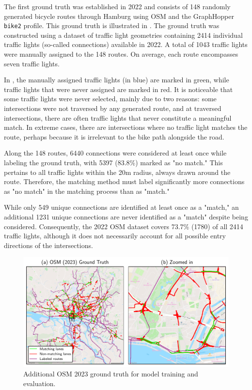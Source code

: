 The first ground truth was established in 2022 and consists of 148 randomly generated bicycle routes through Hamburg using OSM and the GraphHopper \texttt{bike2} profile. This ground truth is illustrated in . The ground truth was constructed using a dataset of traffic light geometries containing 2414 individual traffic lights (so-called connections) available in 2022. A total of 1043 traffic lights were manually assigned to the 148 routes. On average, each route encompasses seven traffic lights.

In , the manually assigned traffic lights (in blue) are marked in green, while traffic lights that were never assigned are marked in red. It is noticeable that some traffic lights were never selected, mainly due to two reasons: some intersections were not traversed by any generated route, and at traversed intersections, there are often traffic lights that never constitute a meaningful match. In extreme cases, there are intersections where no traffic light matches the route, perhaps because it is irrelevant to the bike path alongside the road.

Along the 148 routes, 6440 connections were considered at least once while labeling the ground truth, with 5397 (83.8\%) marked as "no match." This pertains to all traffic lights within the 20m radius, always drawn around the route. Therefore, the matching method must label significantly more connections as "no match" in the matching process than as "match."

While only 549 unique connections are identified at least once as a "match," an additional 1231 unique connections are never identified as a "match" despite being considered. Consequently, the 2022 OSM dataset covers 73.7\% (1780) of all 2414 traffic lights, although it does not necessarily account for all possible entry directions of the intersections.

\begin{figure}[t]
\centering 
\includegraphics[width=\linewidth]{images/matching-ground-truth-osm.pdf}
\caption{Additional OSM 2023 ground truth for model training and evaluation.}
\label{fig:matching-ground-truth-osm}
\end{figure}


